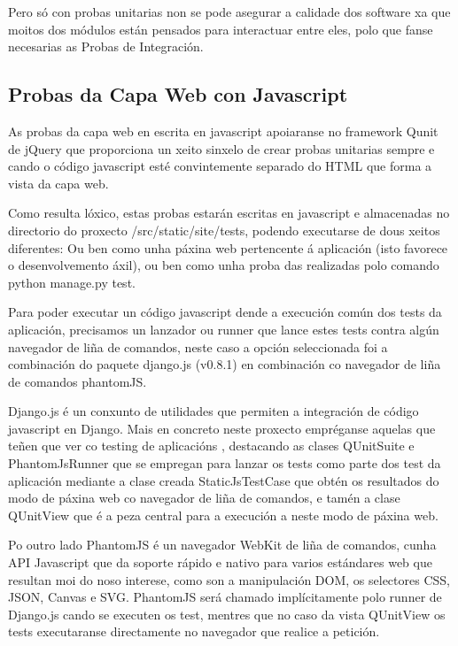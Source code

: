         Pero só con probas unitarias non se pode asegurar a calidade dos software xa que moitos dos
        módulos están pensados para interactuar entre eles, polo que fanse necesarias as Probas de
        Integración.

    \subsection{Probas da Capa Web con Javascript}
        As probas da capa web en escrita en javascript apoiaranse no framework Qunit de 
        jQuery que proporciona un xeito sinxelo de crear probas unitarias sempre e cando o código 
        javascript esté convintemente separado do HTML que forma a vista da capa web.
        
        Como resulta lóxico, estas probas estarán escritas en javascript e almacenadas no directorio
        do proxecto /src/static/site/tests, podendo executarse de dous xeitos diferentes: Ou ben 
        como unha páxina web pertencente á aplicación (isto favorece o desenvolvemento áxil), ou ben
        como unha proba das realizadas polo comando python manage.py test.
        
        Para poder executar un código javascript dende a execución común dos tests da aplicación, 
        precisamos un lanzador ou runner que lance estes tests contra algún navegador de liña de 
        comandos, neste caso a opción seleccionada foi a combinación do paquete django.js (v0.8.1)
        en combinación co navegador de liña de comandos phantomJS. 
        
        Django.js é un conxunto de utilidades que permiten a integración de código javascript en 
        Django. Mais en concreto neste proxecto empréganse aquelas que teñen que ver co testing de
        aplicacións \cite{DjangojsTestTools}, destacando as clases QUnitSuite e PhantomJsRunner que se
        empregan para lanzar os tests como parte dos test da aplicación mediante a clase creada
        StaticJsTestCase que obtén os resultados do modo de páxina web co navegador de liña de 
        comandos, e tamén a clase QUnitView que é a peza central para a execución a neste modo de
        páxina web.
        
        Po outro lado PhantomJS é un navegador WebKit de liña de comandos, cunha API Javascript que
        da soporte rápido e nativo para varios estándares web que resultan moi do noso interese,
        como son a manipulación DOM, os selectores CSS, JSON, Canvas e SVG. PhantomJS será chamado
        implícitamente polo runner de Django.js cando se executen os test, mentres que no caso da 
        vista QUnitView os tests executaranse directamente no navegador que realice a petición.

